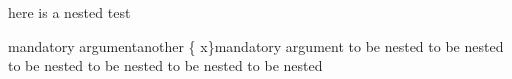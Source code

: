 here is a nested test
\begin{one}{mandatory argument}{another \{ x\}mandatory argument}
	to be nested to be nested
	to be nested to be nested
	to be nested to be nested
\end{one}
